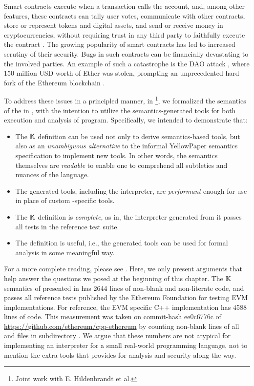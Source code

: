 Smart contracts execute when a transaction calls the account, and, among other features,
these contracts can tally user votes, communicate with other contracts,
store or represent tokens and digital assets, and send or receive money in
cryptocurrencies, without requiring trust in any third party to faithfully
execute the contract \cite{SzaboReport94,PetersBook16}.
The growing popularity of smart contracts has led to increased scrutiny of their security.
Bugs in such contracts can be financially devastating to the involved parties.
An example of such a catastrophe is the DAO attack \cite{delCastilloReport16},
 where 150 million USD worth of Ether was stolen,
 prompting an unprecedented hard fork of the Ethereum blockchain
 \cite{DaianReport16}.

To address these issues in a principled manner, in \cite{HildenbrandtCSF18}
\footnote{Joint work with E. Hildenbrandt et al.},
we formalized the semantics of the \EVM{} in \K{}, with the intention to
utilize the semantics-generated tools for both execution and analysis of \KEVM{}
program. Specifically, we intended to demonstrate that:

\begin{itemize}
  \item The $\mathbb{K}$ definition can be used not only to derive semantics-based
  tools, but also as an \emph{unambiguous alternative} to the
  informal YellowPaper semantics specification to implement new tools. In other
  words, the semantics themselves are \emph{readable} to enable one to
  comprehend all subtleties and nuances of the language.
  \item The generated tools, including the interpreter, are \emph{performant}
  enough for use in place of custom \EVM{}-specific tools.
  \item  The $\mathbb{K}$ definition is \emph{complete}, as in, the interpreter
  generated from it passes all tests in the reference test suite.
  \item The definition is useful, i.e., the generated tools can be used for
  formal analysis in some meaningful way.
\end{itemize}

For a more complete reading, please see
\cite{HildenbrandtCSF18}. Here, we only present arguments that
help answer the questions we posed at the beginning of this chapter.
The $\mathbb{K}{}$ semantics of \EVM{} presented in \cite{HildenbrandtCSF18}
has 2644 lines of non-blank and non-literate code, and passes
all reference tests published by the Ethereum Foundation for testing
EVM implementations. For reference,
the EVM specific C++ implementation has 4588 lines of code.
This measurement was taken on commit-hash ee0c6776c of
\url{https://github.com/ethereum/cpp-ethereum}
by counting non-blank lines of all  and  files
in subdirectory .
We argue that these numbers are not atypical for implementing an
interpreter for a small real-world programming language,
not to mention the extra tools that \K{} provides for analysis and security along the way.

